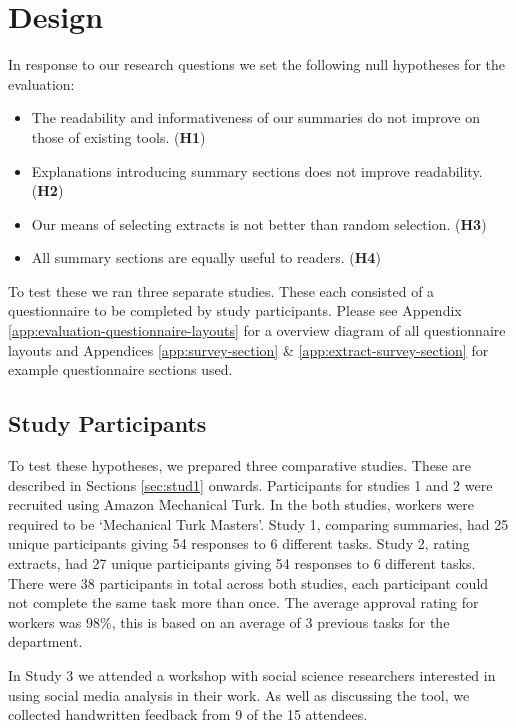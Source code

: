   \section{Design}
    In response to our research questions we set the following null hypotheses for the evaluation:

    \begin{itemize}
      \item{The readability and informativeness of our summaries do not improve on those of existing tools. (\textbf{H1})}
      \item{Explanations introducing summary sections does not improve readability. (\textbf{H2})}
      \item{Our means of selecting extracts is not better than random selection. (\textbf{H3})}
      \item{All summary sections are equally useful to readers. (\textbf{H4})}
    \end{itemize}

    To test these we ran three separate studies. These each consisted of a questionnaire to be completed by study participants. Please see Appendix \ref{app:evaluation-questionnaire-layouts} for a overview diagram of all questionnaire layouts and Appendices \ref{app:survey-section} \& \ref{app:extract-survey-section} for example questionnaire sections used.

    \tocless\subsection{Study Participants}
      To test these hypotheses, we prepared three comparative studies. These are described in Sections \ref{sec:stud1} onwards. Participants for studies 1 and 2 were recruited using Amazon Mechanical Turk. In the both studies, workers were required to be `Mechanical Turk Masters'. Study 1, comparing summaries, had 25 unique participants giving 54 responses to 6 different tasks. Study 2, rating extracts, had 27 unique participants giving 54 responses to 6 different tasks. There were 38 participants in total across both studies, each participant could not complete the same task more than once. The average approval rating for workers was 98\%, this is based on an average of 3 previous tasks for the department.

      In Study 3 we attended a workshop with social science researchers interested in using social media analysis in their work. As well as discussing the tool, we collected handwritten feedback from 9 of the 15 attendees.

